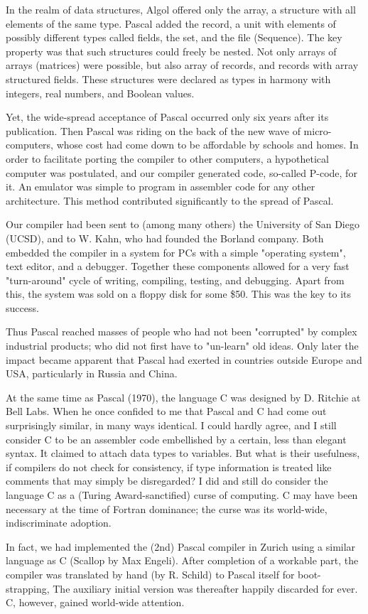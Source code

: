 In the realm of data structures, Algol offered only the array, a structure with all
elements of the same type. Pascal added the record, a unit with elements of
possibly different types called fields, the set, and the file (Sequence). The key
property was that such structures could freely be nested. Not only arrays of arrays
(matrices) were possible, but also array of records, and records with array
structured fields. These structures were declared as types in harmony with
integers, real numbers, and Boolean values.

Yet, the wide-spread acceptance of Pascal occurred only six years after its
publication. Then Pascal was riding on the back of the new wave of micro-
computers, whose cost had come down to be affordable by schools and homes. In
order to facilitate porting the compiler to other computers, a hypothetical computer
was postulated, and our compiler generated code, so-called P-code, for it. An
emulator was simple to program in assembler code for any other architecture. This
method contributed significantly to the spread of Pascal.

Our compiler had been sent to (among many others) the University of San Diego
(UCSD), and to W. Kahn, who had founded the Borland company. Both embedded
the compiler in a system for PCs with a simple "operating system", text editor, and
a debugger. Together these components allowed for a very fast "turn-around"
cycle of writing, compiling, testing, and debugging. Apart from this, the system was
sold on a floppy disk for some \$50. This was the key to its success.

Thus Pascal reached masses of people who had not been "corrupted" by complex
industrial products; who did not first have to "un-learn" old ideas. Only later the
impact became apparent that Pascal had exerted in countries outside Europe and
USA, particularly in Russia and China.

At the same time as Pascal (1970), the language C was designed by D. Ritchie at
Bell Labs. When he once confided to me that Pascal and C had come out
surprisingly similar, in many ways identical. I could hardly agree, and I still consider
C to be an assembler code embellished by a certain, less than elegant syntax. It
claimed to attach data types to variables. But what is their usefulness, if compilers
do not check for consistency, if type information is treated like comments that may
simply be disregarded? I did and still do consider the language C as a (Turing
Award-sanctified) curse of computing. C may have been necessary at the time of
Fortran dominance; the curse was its world-wide, indiscriminate adoption.

In fact, we had implemented the (2nd) Pascal compiler in Zurich using a similar
language as C (Scallop by Max Engeli). After completion of a workable part, the
compiler was translated by hand (by R. Schild) to Pascal itself for boot-strapping,
The auxiliary initial version was thereafter happily discarded for ever. C, however,
gained world-wide attention.
